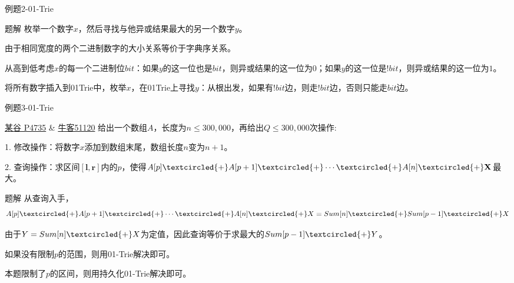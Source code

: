 \documentclass{ctexbeamer}		%
\begin{document}
\begin{frame}{例题2-01-Trie}
    
\begin{block}{题解}
枚举一个数字$x$，然后寻找与他异或结果最大的另一个数字$y$。

\pause

由于相同宽度的两个二进制数字的大小关系等价于字典序关系。

\pause

从高到低考虑$x$的每一个二进制位$bit$：如果$y$的这一位也是$bit$，则异或结果的这一位为$0$；如果$y$的这一位是$!bit$，则异或结果的这一位为$1$。

\pause

将所有数字插入到01Trie中，枚举$x$，在01Trie上寻找$y$：从根出发，如果有$!bit$边，则走$!bit$边，否则只能走$bit$边。

\end{block}
\end{frame}

\begin{frame}{例题3-01-Trie}

\begin{block}{\href{https://www.luogu.com.cn/problem/P4735}{某谷 P4735} \& \href{https://ac.nowcoder.com/acm/problem/51120}{牛客51120}}
给出一个数组$A$，长度为$n \leq 300,000$，再给出$Q \leq 300, 000$次操作:

1. 修改操作：将数字$x$添加到数组末尾，数组长度$n$变为$n+1$。

2. 查询操作：求区间$[\textbf{l},\textbf{r}]$内的$p$，使得$A[p] \textcircled{+} A[p+1]  \textcircled{+} \cdots \textcircled{+}A[n] \textcircled{+} \textbf{X}$最大。
\end{block}

\pause

\begin{block}{题解}
从查询入手，
$$
A[p] \textcircled{+}A[p+1] \textcircled{+} \cdots \textcircled{+} A[n] \textcircled{+} X = 
Sum[n] \textcircled{+} Sum[p-1] \textcircled{+} X
$$

\pause

由于$Y = Sum[n] \textcircled{+} X$为定值，因此查询等价于求最大的$Sum[p-1] \textcircled{+} Y$。

\pause

如果没有限制$p$的范围，则用01-Trie解决即可。

本题限制了$p$的区间，则用持久化01-Trie解决即可。

\end{block}

\end{frame}
\end{document}
